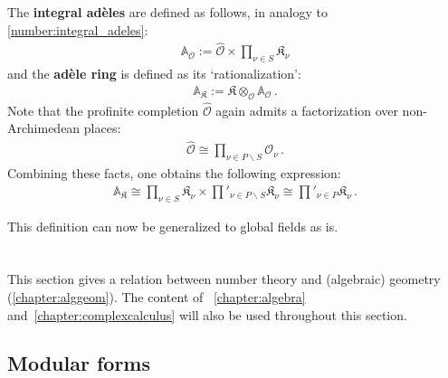     The \textbf{integral ad\`eles} are defined as follows, in analogy to \cref{number:integral_adeles}:
    \begin{gather}
        \mathbb{A}_{\mathcal{O}} := \widehat{\mathcal{O}}\times\prod_{\nu\in S}\mathfrak{K}_\nu
    \end{gather}
    and the \textbf{ad\`ele ring} is defined as its `rationalization':
    \begin{gather}
        \mathbb{A}_{\mathfrak{K}} := \mathfrak{K}\otimes_{\mathcal{O}}\mathbb{A}_{\mathcal{O}}\,.
    \end{gather}
    Note that the profinite completion $\widehat{\mathcal{O}}$ again admits a factorization over non-Archimedean places:
    \begin{gather}
        \widehat{\mathcal{O}}\cong\prod_{\nu\in P\backslash S}\mathcal{O}_\nu\,.
    \end{gather}
    Combining these facts, one obtains the following expression:
    \begin{gather}
        \mathbb{A}_{\mathfrak{K}}\cong\prod_{\nu\in S}\mathfrak{K}_\nu\times\prod'_{\nu\in P\backslash S}\mathfrak{K}_\nu\cong\prod'_{\nu\in P}\mathfrak{K}_\nu\,.
    \end{gather}

    This definition can now be generalized to global fields as is.



\section{}

    This section gives a relation between number theory and (algebraic) geometry (\cref{chapter:alggeom}). The content of ~\ref{chapter:algebra} and~\ref{chapter:complexcalculus} will also be used throughout this section.

\subsection{Modular forms}\label{section:modular_forms}

